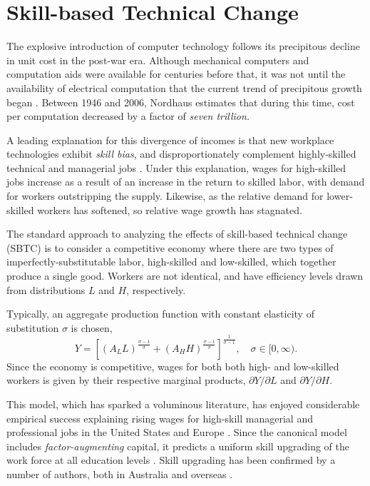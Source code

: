 \documentclass[a4paper,11pt]{article}
\begin{document}
\section{Skill-based Technical Change}

The explosive introduction of computer technology follows its precipitous decline in unit cost in the post-war era. Although mechanical computers and computation aids were available for centuries before that, it was not until the availability of electrical computation that the current trend of precipitous growth began \cite{Nordhaus2007}. Between 1946 and 2006, Nordhaus estimates that during this time, cost per computation decreased by a factor of {\em seven trillion.}



A leading explanation for this divergence of incomes is that new workplace technologies exhibit \emph{skill bias}, and disproportionately complement highly-skilled technical and managerial jobs \citep{Griliches1969,Autor2006}. Under this explanation, wages for high-skilled jobs increase as a result of an increase in the return to skilled labor, with demand for workers outstripping the supply. Likewise, as the relative demand for lower-skilled workers has softened, so relative wage growth has stagnated. 

The standard approach to analyzing the effects of skill-based technical change (SBTC) is to consider a competitive economy where there are two types of imperfectly-substitutable labor, high-skilled and low-skilled, which together produce a single good. Workers are not identical, and have efficiency levels drawn from distributions $L$ and $H$, respectively.

Typically, an aggregate production function with constant elasticity of substitution $\sigma$ is chosen,
$$ Y = \left[
  \left(A_LL \right)^\frac{\sigma-1}{\sigma}
  +
  \left(A_HH \right)^\frac{\sigma-1}{\sigma}
  \right]^\frac{1}{\sigma-1},\quad \sigma \in [0,\infty).
$$
Since the economy is competitive, wages for both both high- and low-skilled workers is given by their respective marginal products, $\partial Y/\partial L$ and $\partial Y/\partial H$.

This model, which has sparked a voluminous literature, has enjoyed considerable empirical success explaining rising wages for high-skill managerial and professional jobs in the United States and Europe \citep{Katz1992}. Since the canonical model includes \emph{factor-augmenting} capital, it predicts a uniform skill upgrading of the work force at all education levels \citep{Levy2003}. Skill upgrading has been confirmed by a number of authors, both in Australia \citep{Esposto2012, Wooden2000, Cully1999} and overseas \citep{Autor2008}. 
\end{document}
